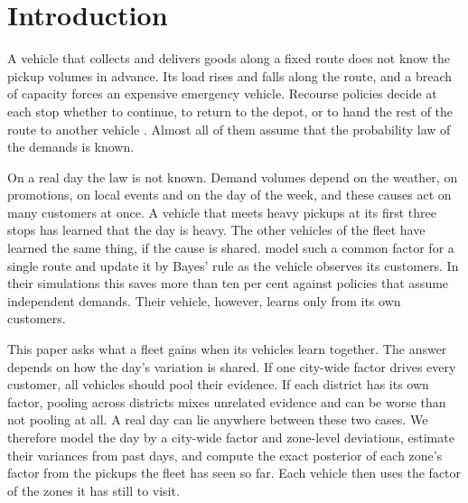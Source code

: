 \documentclass[preprint,authoryear,12pt]{elsarticle}
\begin{document}
\section{Introduction}\label{sec:intro}

A vehicle that collects and delivers goods along a fixed route does not
know the pickup volumes in advance. Its load rises and falls along the
route, and a breach of capacity forces an expensive emergency vehicle.
Recourse policies decide at each stop whether to continue, to return to
the depot, or to hand the rest of the route to another vehicle
\citep{yang2000restocking,secomandi2009reopt,florio2022partial}. Almost
all of them assume that the probability law of the demands is known.

On a real day the law is not known. Demand volumes depend on the
weather, on promotions, on local events and on the day of the week, and
these causes act on many customers at once. A vehicle that meets heavy
pickups at its first three stops has learned that the day is heavy. The
other vehicles of the fleet have learned the same thing, if the cause is
shared. \citet{florio2023bayesian} model such a common factor for a
single route and update it by Bayes' rule as the vehicle observes its
customers. In their simulations this saves more than ten per cent
against policies that assume independent demands. Their vehicle, however, learns only
from its own customers.

This paper asks what a fleet gains when its vehicles learn together. The
answer depends on how the day's variation is shared. If one city-wide
factor drives every customer, all vehicles should pool their evidence.
If each district has its own factor, pooling across districts mixes
unrelated evidence and can be worse than not pooling at all. A real day
can lie anywhere between these two cases. We therefore model the day by a city-wide factor and
zone-level deviations, estimate their variances from past days, and
compute the exact posterior of each zone's factor from the pickups the
fleet has seen so far. Each vehicle then uses the factor of the zones it
has still to visit.
\end{document}
